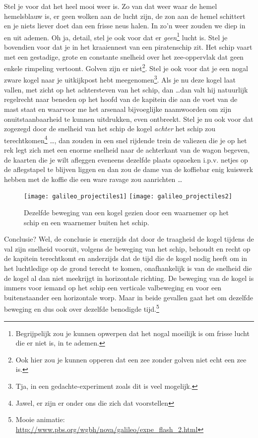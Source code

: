 \documentclass{ximera}
\begin{document}
	Stel je voor dat het heel mooi weer is. Zo van dat weer waar de hemel hemelsblauw is, er geen wolken aan de lucht zijn, de zon aan de hemel schittert en je niets liever doet dan een frisse neus halen. In zo'n weer zouden we diep in en uit ademen. Oh ja, detail, stel je ook voor dat er \emph{geen}\footnote{Begrijpelijk zou je kunnen opwerpen dat het nogal moeilijk is om frisse lucht die er niet is, in te ademen.} lucht is. Stel je bovendien voor dat je in het kraaiennest van een piratenschip zit. Het schip vaart met een gestadige, grote en constante snelheid over het zee-oppervlak dat geen enkele rimpeling vertoont. Golven zijn er niet\footnote{Ook hier zou je kunnen opperen dat een zee zonder golven niet echt een zee is.}. Stel je ook voor dat je een nogal zware kogel naar je uitkijkpost hebt meegenomen\footnote{Tja, in een gedachte-experiment zoals dit is veel mogelijk.}. Als je nu deze kogel laat vallen, met zicht op het achtersteven van het schip, dan \ldots dan valt hij natuurlijk regelrecht naar beneden op het hoofd van de kapitein die aan de voet van de mast staat en waarvoor me het arsenaal bijvoeglijke naamwoorden om zijn onuitstaanbaarheid te kunnen uitdrukken, even ontbreekt. Stel je nu ook voor dat zogezegd door de snelheid van het schip de kogel \emph{achter} het schip zou terechtkomen\footnote{Jawel, er zijn er onder ons die zich dat voorstellen} \ldots, dan zouden in een snel rijdende trein de valiezen die je op het rek legt zich met een enorme snelheid naar de achterkant van de wagon begeven, de kaarten die je wilt afleggen eveneens dezelfde plaats opzoeken i.p.v. netjes op de  aflegstapel te blijven liggen en dan zou de dame van de koffiebar enig kuiswerk hebben met de koffie die een ware ravage zou aanrichten \ldots 
	\begin{figure}[h]
	\centering
	\texttt{[image: galileo\_projectiles1]} 
	\texttt{[image: galileo\_projectiles2]} 
	\caption{Dezelfde beweging van een kogel gezien door een waarnemer op het schip en een waarnemer buiten het schip.}
	\end{figure}
	Conclusie? Wel, de conclusie is enerzijds dat door de traagheid de kogel tijdens de val zijn snelheid vooruit, volgens de beweging van het schip, behoudt en recht op de kapitein terechtkomt en anderzijds dat de tijd die de kogel nodig heeft om in het luchtledige op de grond terecht te komen, onafhankelijk is van de snelheid die de kogel al dan niet meekrijgt in horizontale richting. De beweging van de kogel is immers voor iemand op het schip een verticale valbeweging en voor een buitenstaander een horizontale worp. Maar in beide gevallen gaat het om dezelfde beweging en dus ook over dezelfde benodigde tijd.\footnote{Mooie animatie: \url{http://www.pbs.org/wgbh/nova/galileo/expe_flash_2.html}}
	
	
	
\end{document}
